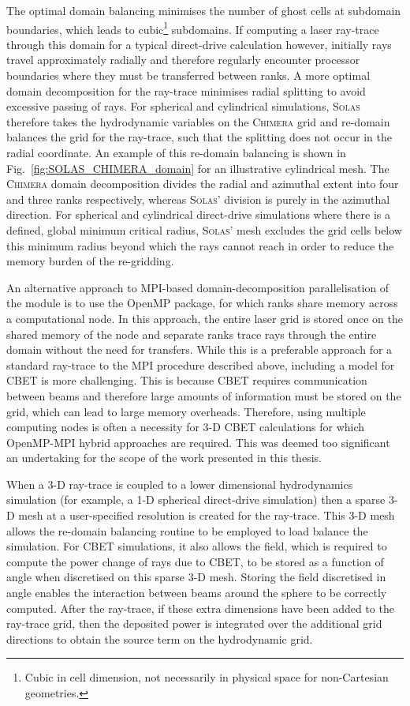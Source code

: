 The optimal domain balancing minimises the number of ghost cells at subdomain boundaries, which leads to cubic\footnote{Cubic in cell dimension, not necessarily in physical space for non-Cartesian geometries.} subdomains.
If computing a laser ray-trace through this domain for a typical direct-drive calculation however, initially rays travel approximately radially and therefore regularly encounter processor boundaries where they must be transferred between ranks.
A more optimal domain decomposition for the ray-trace minimises radial splitting to avoid excessive passing of rays.
For spherical and cylindrical simulations, \textsc{Solas} therefore takes the hydrodynamic variables on the \textsc{Chimera} grid and re-domain balances the grid for the ray-trace, such that the splitting does not occur in the radial coordinate.
An example of this re-domain balancing is shown in Fig.~\ref{fig:SOLAS_CHIMERA_domain} for an illustrative cylindrical mesh.
The \textsc{Chimera} domain decomposition divides the radial and azimuthal extent into four and three ranks respectively, whereas \textsc{Solas}' division is purely in the azimuthal direction.
For spherical and cylindrical direct-drive simulations where there is a defined, global minimum critical radius, \textsc{Solas}' mesh excludes the grid cells below this minimum radius beyond which the rays cannot reach in order to reduce the memory burden of the re-gridding.

An alternative approach to \ac{MPI}-based domain-decomposition parallelisation of the module is to use the \ac{OpenMP} package, for which ranks share memory across a computational node.
In this approach, the entire laser grid is stored once on the shared memory of the node and separate ranks trace rays through the entire domain without the need for transfers.
While this is a preferable approach for a standard ray-trace to the \ac{MPI} procedure described above, including a model for \ac{CBET} is more challenging.
This is because \ac{CBET} requires communication between beams and therefore large amounts of information must be stored on the grid, which can lead to large memory overheads.
Therefore, using multiple computing nodes is often a necessity for 3-D \ac{CBET} calculations for which \ac{OpenMP}-\ac{MPI} hybrid approaches are required.
This was deemed too significant an undertaking for the scope of the work presented in this thesis.

When a 3-D ray-trace is coupled to a lower dimensional hydrodynamics simulation (for example, a 1-D spherical direct-drive simulation) then a sparse 3-D mesh at a user-specified resolution is created for the ray-trace.
This 3-D mesh allows the re-domain balancing routine to be employed to load balance the simulation.
For \ac{CBET} simulations, it also allows the field, which is required to compute the power change of rays due to \ac{CBET}, to be stored as a function of angle when discretised on this sparse 3-D mesh.
Storing the field discretised in angle enables the interaction between beams around the sphere to be correctly computed.
After the ray-trace, if these extra dimensions have been added to the ray-trace grid, then the deposited power is integrated over the additional grid directions to obtain the source term on the hydrodynamic grid.

